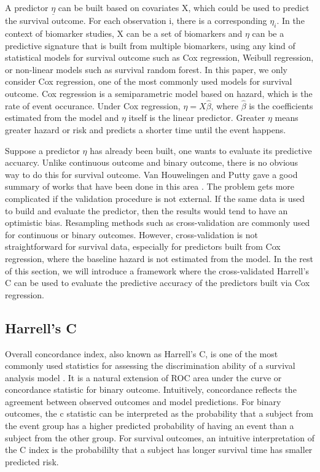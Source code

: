 \documentclass[11pt]{article}
\begin{document}
	\par A predictor $\underline{\eta}$ can be built based on covariates X, which could be used to predict the survival outcome. For each observation i, there is a corresponding $\eta_{i}$. In the context of biomarker studies, X can be a set of biomarkers and $\eta$ can be a predictive signature that is built from multiple biomarkers, using any kind of statistical models for survival outcome such as Cox regression, Weibull regression, or non-linear models such as survival random forest. In this paper, we only consider Cox regression, one of the most commonly used models for survival outcome. Cox regression is a semiparametric model based on hazard, which is the rate of event occurance. Under Cox regression, $\eta = X\hat{\beta}$, where $\hat{\beta}$ is the coefficients estimated from the model and $\eta$ itself is the linear predictor\citep{Cox}. Greater $\eta$ means greater hazard or risk and predicts a shorter time until the event happens.	

	\par Suppose a predictor $\eta$ has already been built, one wants to evaluate its predictive accuarcy. Unlike continuous outcome and binary outcome, there is no obvious way to do this for survival outcome. Van Houwelingen and Putty gave a good summary of works that have been done in this area \citep{Houwelingen2011}. The problem gets more complicated if the validation procedure is not external. If the same data is used to build and evaluate the predictor, then the results would tend to have an optimistic bias. Resampling methods such as cross-validation are commonly used for continuous or binary outcomes. However, cross-validation is not straightforward for survival data, especially for predictors built from Cox regression, where the baseline hazard is not estimated from the model. In the rest of this section, we will introduce a framework where the cross-validated Harrell's C can be used to evaluate the predictive accuracy of the predictors built via Cox regression.
	
	\subsection{Harrell's C}
	
	\par Overall concordance index, also known as Harrell's C, is one of the most commonly used statistics for assessing the discrimination ability of a survival analysis model \citep{HarrellJr1982}. It is a natural extension of ROC area under the curve or concordance statistic for binary outcome. Intuitively, concordance reflects the agreement between observed outcomes and model predictions. For binary outcomes, the c statistic can be interpreted as the probability that a subject from the event group has a higher predicted probability of having an event than a subject from the other group. For survival outcomes, an intuitive interpretation of the C index is the probabililty that a subject has longer survival time has smaller predicted risk.
\end{document}
